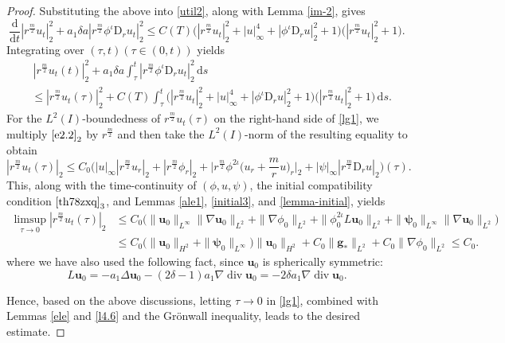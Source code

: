 \documentclass[11pt,reqno]{amsart}
\DeclareMathOperator{\diver}{\mathrm{div}}
\numberwithin{rk}{section}
\numberwithin{prop}{section}
\numberwithin{mydef}{section}
\numberwithin{lem}{section}
\numberwithin{equation}{section}
\numberwithin{thm}{section}
\begin{document}
\begin{proof}
Substituting the above into \eqref{util2}, along with Lemma \ref{im-2}, gives
\begin{equation*} 
\frac{\mathrm{d}}{\mathrm{d}t}|r^{\frac{m}{2}}u_t|^2_2+a_1\delta a |r^{\frac{m}{2}}\phi^\iota\mathrm{D}_r u_t|_2^2 \leq C(T)\big(|r^{\frac{m}{2}}u_{t}|_2^2+|u|_\infty^4+ |\phi^\iota\mathrm{D}_r u|_2^2+1\big)\big(|r^{\frac{m}{2}}u_{t}|_2^2+1\big).
\end{equation*}
Integrating over $(\tau, t)(\tau\in (0,t))$ yields
\begin{equation}\label{lg1}
\begin{aligned}
&\,|r^{\frac{m}{2}}u_t(t)|_2^2+a_1\delta a\int_\tau^t |r^{\frac{m}{2}}\phi^\iota\mathrm{D}_r u_t|_2^2\,\mathrm{d}s\\
&\leq  |r^{\frac{m}{2}}u_t(\tau)|_2^2+C(T)\int_\tau^t\big(|r^{\frac{m}{2}}u_{t}|_2^2+|u|_\infty^4+ |\phi^\iota\mathrm{D}_r u|_2^2+1\big)\big(|r^\frac{m}{2}u_t|_2^2+1\big)\,\mathrm{d}s.
\end{aligned}
\end{equation}
For the $L^2(I)$-boundedness of $r^{\frac{m}{2}}u_t(\tau)$ 
on the right-hand side of \eqref{lg1}, we multiply $\eqref{e2.2}_2$ by $r^\frac{m}{2}$ and then take the $L^2(I)$-norm of the resulting equality to obtain 
\begin{equation*}
|r^{\frac{m}{2}}u_t(\tau)|_2\leq C_0\big(|u|_\infty|r^{\frac{m}{2}}u_r|_2+|r^{\frac{m}{2}}\phi_r|_2+ \Big|r^{\frac{m}{2}}\phi^{2\iota}\big(u_r+\frac{m}{r}u\big)_r\Big|_2+|\psi|_\infty |r^{\frac{m}{2}}\mathrm{D}_r u|_2\big)(\tau).
\end{equation*}
This, along with the time-continuity of $(\phi,u,\psi)$, the initial compatibility condition $\eqref{th78zxq}_3$, and 
Lemmas \ref{ale1}, \ref{initial3}, and \ref{lemma-initial}, yields
\begin{equation*}
\begin{aligned}
\limsup_{\tau\to 0} |r^{\frac{m}{2}}u_t(\tau)|_2&\leq C_0 \big(\|\boldsymbol{u}_0\|_{L^\infty}\|\nabla\boldsymbol{u}_0\|_{L^2}+ \|\nabla\phi_0\|_{L^2}+\|\phi_0^{2\iota}L\boldsymbol{u}_0\|_{L^2} + \|\boldsymbol{\psi}_0\|_{L^\infty} \|\nabla\boldsymbol{u}_0\|_{L^2}\big)\\[1pt]
&\leq C_0\big(\|\boldsymbol{u}_0\|_{H^2}+\|\boldsymbol{\psi}_0\|_{L^\infty}\big)\|\boldsymbol{u}_0\|_{H^2} +C_0\|\boldsymbol{g}_*\|_{L^2}+C_0 \|\nabla\phi_0\|_{L^2} \leq C_0.
\end{aligned}
\end{equation*}
where we have also used the following fact, since $\boldsymbol{u}_0$ is spherically symmetric:
\begin{equation}\label{Lu=}
L\boldsymbol{u}_0=-a_1 \Delta\boldsymbol{u}_0-(2\delta-1)a_1\nabla\diver \boldsymbol{u}_0=-2\delta a_1\nabla\diver \boldsymbol{u}_0.
\end{equation}


Hence, based on the above discussions, letting $\tau\to 0$ in \eqref{lg1}, combined with Lemmas \ref{ele} and \ref{l4.6} and the Gr\"onwall inequality, leads to the desired estimate.
\end{proof}
\end{document}
